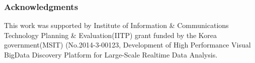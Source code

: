 \documentclass{article} \usepackage{iclr2023_conference,times}
\begin{document}
\subsubsection*{Acknowledgments}
This work was supported by Institute of Information \& Communications Technology Planning \& Evaluation(IITP) grant funded by the Korea government(MSIT) (No.2014-3-00123, Development of High Performance Visual BigData Discovery Platform for Large-Scale Realtime Data Analysis.




\end{document}
